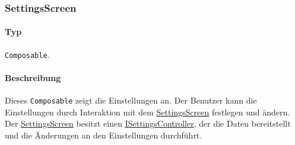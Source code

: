 \subsubsection{SettingsScreen}\label{App_Settings_SettingsScreen}
\paragraph*{Typ}
\texttt{Composable}.
\paragraph*{Beschreibung}
Dieses \texttt{Composable} zeigt die Einstellungen an. 
Der Benutzer kann die Einstellungen durch Interaktion mit dem \hyperref[App_Settings_SettingsScreen]{SettingsScreen} festlegen und ändern.\\
Der \hyperref[App_Settings_SettingsScreen]{SettingsScreen} besitzt einen \hyperref[App_Settings_ISettingsController]{ISettingsController}, der die Daten bereitstellt und die Änderungen an den Einstellungen durchführt. 

